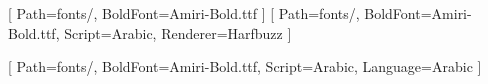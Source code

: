 \usepackage{iftex}
\ifLuaTeX
  \usepackage{fontspec}
  \usepackage{polyglossia}
  \setdefaultlanguage{arabic}
  \newfontfamily{}[
    Path=fonts/,
    BoldFont=Amiri-Bold.ttf
  ]
  \setmainfont{Amiri-Regular.ttf}[
    Path=fonts/,
    BoldFont=Amiri-Bold.ttf,
    Script=Arabic,
    Renderer=Harfbuzz
  ]
\else
  \usepackage{fontspec}
  \setmainfont{Amiri-Regular.ttf}[
    Path=fonts/,
    BoldFont=Amiri-Bold.ttf,
    Script=Arabic,
    Language=Arabic
  ]
  \usepackage{bidi}
  \setRTL
\fi
